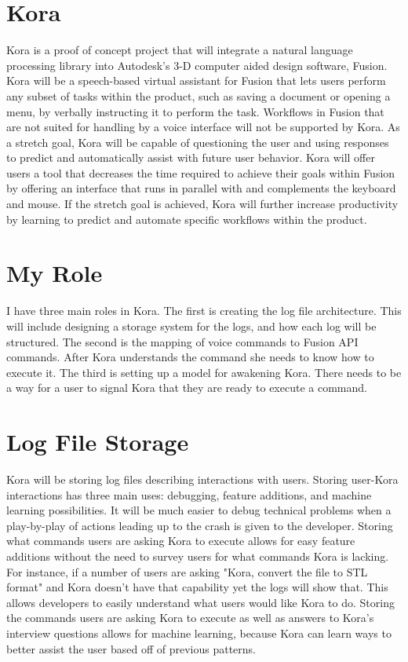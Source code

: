 \documentclass[onecolumn, draftclsnofoot,10pt, compsoc]{IEEEtran}
\begin{document}
	\section{Kora}
		Kora is a proof of concept project that will integrate a natural language processing library into Autodesk's 3-D computer aided design software, Fusion.
		Kora will be a speech-based virtual assistant for Fusion that lets users perform any subset of tasks within the product, such as saving a document or opening a menu, by verbally instructing it to perform the task.
		Workflows in Fusion that are not suited for handling by a voice interface will not be supported by Kora.
		As a stretch goal, Kora will be capable of questioning the user and using responses to predict and automatically assist with future user behavior.
		Kora will offer users a tool that decreases the time required to achieve their goals within Fusion by offering an interface that runs in parallel with and complements the keyboard and mouse.
		If the stretch goal is achieved, Kora will further increase productivity by learning to predict and automate specific workflows within the product.
		
		
	\section{My Role}
		I have three main roles in Kora.
		The first is creating the log file architecture.
		This will include designing a storage system for the logs, and how each log will be structured.
		The second is the mapping of voice commands to Fusion API commands.
		After Kora understands the command she needs to know how to execute it.
		The third is setting up a model for awakening Kora.
		There needs to be a way for a user to signal Kora that they are ready to execute a command.
		
		
	\section{Log File Storage}
		Kora will be storing log files describing interactions with users.
		Storing user-Kora interactions has three main uses: debugging, feature additions, and machine learning possibilities.
		It will be much easier to debug technical problems when a play-by-play of actions leading up to the crash is given to the developer.
		Storing what commands users are asking Kora to execute allows for easy feature additions without the need to survey users for what commands Kora is lacking.
		For instance, if a number of users are asking "Kora, convert the file to STL format" and Kora doesn't have that capability yet the logs will show that.
		This allows developers to easily understand what users would like Kora to do.
		Storing the commands users are asking Kora to execute as well as answers to Kora's interview questions allows for machine learning, because Kora can learn ways to better assist the user based off of previous patterns.
\end{document}
